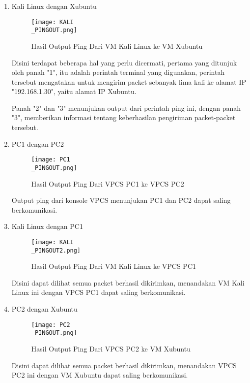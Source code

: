 \documentclass[12pt, a4paper]{article}
\begin{document}
      \begin{enumerate}[label=\arabic*.]

      \item Kali Linux dengan Xubuntu

          \begin{figure}[h]
              \centering
              \texttt{[image: KALI\\\_PINGOUT.png]}
              \caption{\small{Hasil Output Ping Dari VM Kali Linux ke VM Xubuntu}}
          \end{figure}    

          Disini terdapat beberapa hal yang perlu dicermati, pertama yang
          ditunjuk oleh panah "1", itu adalah perintah terminal yang digunakan,
          perintah tersebut mengatakan untuk mengirim packet sebanyak lima kali
          ke alamat IP "192.168.1.30", yaitu alamat IP Xubuntu.

          Panah "2" dan "3" menunjukan output dari perintah ping ini, dengan panah
          "3", memberikan informasi tentang keberhasilan pengiriman
          packet-packet tersebut.

      \item PC1 dengan PC2

      \begin{figure}[h]
          \centering
          \texttt{[image: PC1\\\_PINGOUT.png]}
          \caption{\small{Hasil Output Ping Dari VPCS PC1 ke VPCS PC2}}
      \end{figure}    

        Output ping dari konsole VPCS menunjukan PC1 dan PC2 dapat saling
        berkomunikasi.

      \newpage
      \item Kali Linux dengan PC1

      \begin{figure}[h]
          \centering
          \texttt{[image: KALI\\\_PINGOUT2.png]}
          \caption{\small{Hasil Output Ping Dari VM Kali Linux ke VPCS PC1}}
      \end{figure}    

          Disini dapat dilihat semua packet berhasil dikirimkan, menandakan
          VM Kali Linux ini dengan VPCS PC1 dapat saling berkomunikasi.

      \item PC2 dengan Xubuntu

      \begin{figure}[h]
          \centering
          \texttt{[image: PC2\\\_PINGOUT.png]}
          \caption{\small{Hasil Output Ping Dari VPCS PC2 ke VM Xubuntu}}
      \end{figure}    

          Disini dapat dilihat semua packet berhasil dikirimkan, menandakan
          VPCS PC2 ini dengan VM Xubuntu dapat saling berkomunikasi.

      \end{enumerate}
\end{document}

